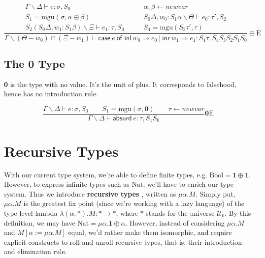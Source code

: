 \documentclass{article}
\newcommand{\one}{\textbf{1}}
\newcommand{\zero}{\textbf{0}}
\newcommand{\mgu}[2]{\mathrm{mgu}(#1, #2)}
\newcommand{\newvar}{\mathit{newvar}}
\newcommand{\caseof}[5]{\textsf{case} ~ #1 ~ \textsf{of inl} ~ #2 \Rightarrow #3 ~ | ~ \textsf{inr} ~ #4 \Rightarrow #5}
\newcommand{\absurd}{\textsf{absurd} ~ }
\begin{document}
\begin{displaymath}
  \frac
    {\begin{array}{ll}
      \Gamma \backslash \Delta \vdash e : \sigma, S_0 \qquad &
      \alpha, \beta \leftarrow \newvar \\
      S_1 = \mgu{\sigma}{\alpha \oplus \beta} \qquad &
      S_0 \Delta, w_0 : S_1 \alpha \backslash \Theta \vdash e_0 : \tau', S_2 \\
      S_2 (S_0 \Delta, w_1 : S_1 \beta) \backslash \Xi \vdash e_1 : \tau, S_3 \qquad &
      S_4 = \mgu{S_3 \tau'}{\tau}
    \end{array}}
    {\Gamma \backslash (\Theta - w_0) \cap (\Xi - w_1) \vdash \caseof{e}{w_0}{e_0}{w_1}{e_1} : S_4 \tau, S_4 S_3 S_2 S_1 S_0}
  \oplus \mathrm{E}
\end{displaymath}

\subsection{The \textbf{0} Type}

\textbf{0} is the type with no value. It's the unit of plus. It corresponds to falsehood, hence has no introduction rule.

\begin{displaymath}
  \frac
    {\Gamma \backslash \Delta \vdash e : \sigma, S_0 \qquad
    S_1 = \mgu{\sigma}{\zero} \qquad
    \tau \leftarrow \newvar}
    {\Gamma \backslash \Delta \vdash \absurd e : \tau, S_1 S_0}
  \zero \mathrm{E}
\end{displaymath}

\section{Recursive Types}

With our current type system, we're able to define finite types, e.g. $\mathrm{Bool} = \one \oplus \one$. However, to express infinite types such as $\mathrm{Nat}$, we'll have to enrich our type system. Thus we introduce \textbf{recursive types} \cite[section~6.4]{pfenning02}, written as $\mu \alpha. M$. Simply put, $\mu \alpha. M$ is the greatest fix point (since we're working with a lazy language) of the type-level lambda $\lambda (\alpha : *). M : * \to *$, where $*$ stands for the universe $\mathcal{U}_0$. By this definition, we may have $\mathrm{Nat} = \mu \alpha. \one \oplus \alpha$. However, instead of considering $\mu \alpha. M$ and $M[\alpha := \mu \alpha. M]$ equal, we'd rather make them isomorphic, and require explicit constructs to roll and unroll recursive types, that is, their introduction and elimination rule.
\end{document}
